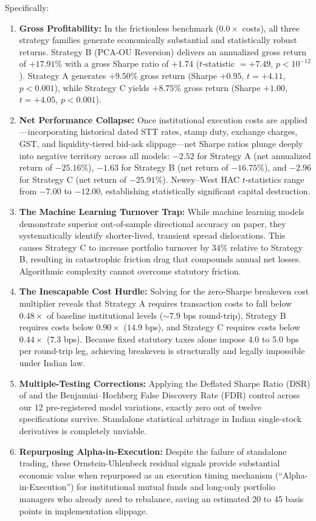 \documentclass[11pt,a4paper]{article}
\begin{document}
Specifically:
\begin{enumerate}
    \item \textbf{Gross Profitability:} In the frictionless benchmark ($0.0\times$ costs), all three strategy families generate economically substantial and statistically robust returns. Strategy B (PCA-OU Reversion) delivers an annualized gross return of $+17.91\%$ with a gross Sharpe ratio of $+1.74$ ($t$-statistic $= +7.49$, $p < 10^{-12}$). Strategy A generates $+9.50\%$ gross return (Sharpe $+0.95$, $t = +4.11$, $p < 0.001$), while Strategy C yields $+8.75\%$ gross return (Sharpe $+1.00$, $t = +4.05$, $p < 0.001$).
    \item \textbf{Net Performance Collapse:} Once institutional execution costs are applied---incorporating historical dated STT rates, stamp duty, exchange charges, GST, and liquidity-tiered bid-ask slippage---net Sharpe ratios plunge deeply into negative territory across all models: $-2.52$ for Strategy A (net annualized return of $-25.16\%$), $-1.63$ for Strategy B (net return of $-16.75\%$), and $-2.96$ for Strategy C (net return of $-25.91\%$). Newey--West HAC $t$-statistics range from $-7.00$ to $-12.00$, establishing statistically significant capital destruction.
    \item \textbf{The Machine Learning Turnover Trap:} While machine learning models demonstrate superior out-of-sample directional accuracy on paper, they systematically identify shorter-lived, transient spread dislocations. This causes Strategy C to increase portfolio turnover by 34\% relative to Strategy B, resulting in catastrophic friction drag that compounds annual net losses. Algorithmic complexity cannot overcome statutory friction.
    \item \textbf{The Inescapable Cost Hurdle:} Solving for the zero-Sharpe breakeven cost multiplier reveals that Strategy A requires transaction costs to fall below $0.48\times$ of baseline institutional levels ($\sim 7.9$ bps round-trip), Strategy B requires costs below $0.90\times$ ($14.9$ bps), and Strategy C requires costs below $0.44\times$ ($7.3$ bps). Because fixed statutory taxes alone impose 4.0 to 5.0 bps per round-trip leg, achieving breakeven is structurally and legally impossible under Indian law.
    \item \textbf{Multiple-Testing Corrections:} Applying the Deflated Sharpe Ratio (DSR) of \citet{bailey2014deflated} and the Benjamini--Hochberg False Discovery Rate (FDR) control \citep{benjamini1995controlling} across our 12 pre-registered model variations, exactly zero out of twelve specifications survive. Standalone statistical arbitrage in Indian single-stock derivatives is completely unviable.
    \item \textbf{Repurposing Alpha-in-Execution:} Despite the failure of standalone trading, these Ornstein-Uhlenbeck residual signals provide substantial economic value when repurposed as an execution timing mechanism (``Alpha-in-Execution'') for institutional mutual funds and long-only portfolio managers who already need to rebalance, saving an estimated 20 to 45 basis points in implementation slippage.
\end{enumerate}
\end{document}
